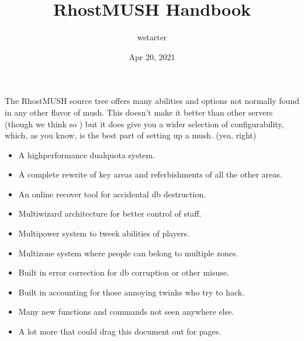 \documentclass[letterpaper,10pt,english]{sphinxmanual}
\title{RhostMUSH Handbook}
\date{Apr 20, 2021}
\author{wstarter}
\begin{document}
\pagestyle{empty}
\sphinxmaketitle
\pagestyle{plain}
\sphinxtableofcontents
\pagestyle{normal}
\label{\detokenize{index::doc}}


\sphinxAtStartPar
The RhostMUSH source tree offers many abilities and options
not normally found in any other flavor of mush.  This doesn’t
make it better than other servers (though we think so )
but it does give you a wider selection of configurability,
which, as you know, is the best part of setting up a mush.
(yea, right)
\begin{itemize}
\item {} 
\sphinxAtStartPar
A high\sphinxhyphen{}performance dual\sphinxhyphen{}quota system.

\item {} 
\sphinxAtStartPar
A complete rewrite of key areas and referbishments of all the other areas.

\item {} 
\sphinxAtStartPar
An on\sphinxhyphen{}line recover tool for accidental db destruction.

\item {} 
\sphinxAtStartPar
Multi\sphinxhyphen{}wizard architecture for better control of staff.

\item {} 
\sphinxAtStartPar
Multi\sphinxhyphen{}power system to tweek abilities of players.

\item {} 
\sphinxAtStartPar
Multi\sphinxhyphen{}zone system where people can belong to multiple zones.

\item {} 
\sphinxAtStartPar
Built in error correction for db corruption or other misuse.

\item {} 
\sphinxAtStartPar
Built in accounting for those annoying twinks who try to hack.

\item {} 
\sphinxAtStartPar
Many new functions and commands not seen anywhere else.

\item {} 
\sphinxAtStartPar
A lot more that could drag this document out for pages.

\end{itemize}
\end{document}
